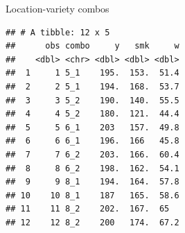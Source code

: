 \documentclass[
  ignorenonframetext,
]{beamer}
\newenvironment{Shaded}{\begin{snugshade}}{\end{snugshade}}
\newcommand{\KeywordTok}[1]{\textcolor[rgb]{0.13,0.29,0.53}{\textbf{#1}}}
\newcommand{\NormalTok}[1]{#1}
\newcommand{\OperatorTok}[1]{\textcolor[rgb]{0.81,0.36,0.00}{\textbf{#1}}}
\newcommand{\StringTok}[1]{\textcolor[rgb]{0.31,0.60,0.02}{#1}}
\begin{document}
\begin{frame}[fragile]{Location-variety combos}
\protect\hypertarget{location-variety-combos}{}

\footnotesize

\begin{Shaded}
\end{Shaded}

\begin{verbatim}
## # A tibble: 12 x 5
##      obs combo     y   smk     w
##    <dbl> <chr> <dbl> <dbl> <dbl>
##  1     1 5_1    195.  153.  51.4
##  2     2 5_1    194.  168.  53.7
##  3     3 5_2    190.  140.  55.5
##  4     4 5_2    180.  121.  44.4
##  5     5 6_1    203   157.  49.8
##  6     6 6_1    196.  166   45.8
##  7     7 6_2    203.  166.  60.4
##  8     8 6_2    198.  162.  54.1
##  9     9 8_1    194.  164.  57.8
## 10    10 8_1    187   165.  58.6
## 11    11 8_2    202.  167.  65  
## 12    12 8_2    200   174.  67.2
\end{verbatim}

\normalsize

\end{frame}
\end{document}
